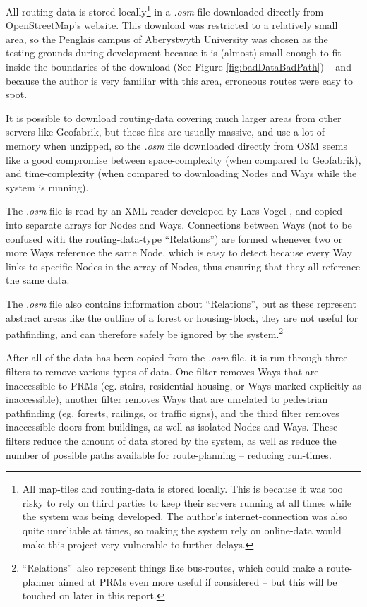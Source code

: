 All routing-data is stored locally\footnote{All map-tiles and routing-data is stored locally. This is because it was too risky to rely on third parties to keep their servers running at all times while the system was being developed. The author's internet-connection was also quite unreliable at times, so making the system rely on online-data would make this project very vulnerable to further delays.} in a \textit{.osm} file downloaded directly from OpenStreetMap's website\cite{OSM}. This download was restricted to a relatively small area, so the Penglais campus of Aberystwyth University was chosen as the testing-grounds during development because it is (almost) small enough to fit inside the boundaries of the download (See Figure \ref{fig:badDataBadPath}) -- and because the author is very familiar with this area, erroneous routes were easy to spot.

It is possible to download routing-data covering much larger areas from other servers like Geofabrik\cite{geofabrik}, but these files are usually massive, and use a lot of memory when unzipped, so the \textit{.osm} file downloaded directly from OSM seems like a good compromise between space-complexity (when compared to Geofabrik), and time-complexity (when compared to downloading Nodes and Ways while the system is running).

The \textit{.osm} file is read by an XML-reader developed by Lars Vogel \cite{Vogella-XML}, and copied into separate arrays for Nodes and Ways. Connections between Ways (not to be confused with the routing-data-type \textquotedblleft Relations\textquotedblright\cite{OSM-Relation}) are formed whenever two or more Ways reference the same Node, which is easy to detect because every Way links to specific Nodes in the array of Nodes, thus ensuring that they all reference the same data.

The \textit{.osm} file also contains information about \textquotedblleft Relations\textquotedblright, but as these represent abstract areas like the outline of a forest or housing-block, they are not useful for pathfinding, and can therefore safely be ignored by the system.\footnote{\textquotedblleft Relations\textquotedblright~also represent things like bus-routes, which could make a route-planner aimed at PRMs even more useful if considered -- but this will be touched on later in this report.}

After all of the data has been copied from the \textit{.osm} file, it is run through three filters to remove various types of data. One filter removes Ways that are inaccessible to PRMs (eg. stairs, residential housing, or Ways marked explicitly as inaccessible), another filter removes Ways that are unrelated to pedestrian pathfinding (eg. forests, railings, or traffic signs), and the third filter removes inaccessible doors from buildings, as well as isolated Nodes and Ways. These filters reduce the amount of data stored by the system, as well as reduce the number of possible paths available for route-planning -- reducing run-times.

